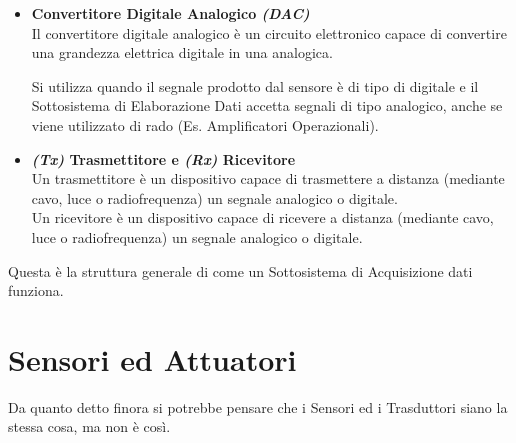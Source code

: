 \documentclass[12pt, letterpaper]{book}
\begin{document}
\begin{itemize}[leftmargin=1.2cm, itemsep=1pt, topsep=5pt]
          Si utilizza quando il Sottosistema di Elaborazione Dati accetta solo segnali di tipo digitali (Es. Computer, Arduino).
    \item \textbf{Convertitore Digitale Analogico \textit{(DAC)}}\\
          Il convertitore digitale analogico è un circuito elettronico capace di convertire una grandezza elettrica digitale in una analogica.

          Si utilizza quando il segnale prodotto dal sensore è di tipo di digitale e il Sottosistema di Elaborazione Dati accetta segnali di tipo analogico, anche se viene utilizzato di rado (Es. Amplificatori Operazionali).
    \item \textbf{\textit{(Tx)} Trasmettitore e \textit{(Rx)} Ricevitore}\\
          Un trasmettitore è un dispositivo capace di trasmettere a distanza (mediante cavo, luce o radiofrequenza) un segnale analogico o digitale.\\
          Un ricevitore è un dispositivo capace di ricevere a distanza (mediante cavo, luce o radiofrequenza) un segnale analogico o digitale.
  \end{itemize}

  Questa è la struttura generale di come un Sottosistema di Acquisizione dati funziona.  

  \section{Sensori ed Attuatori}

  Da quanto detto finora si potrebbe pensare che i Sensori ed i Trasduttori siano la stessa cosa, ma non è così.
\end{document}
